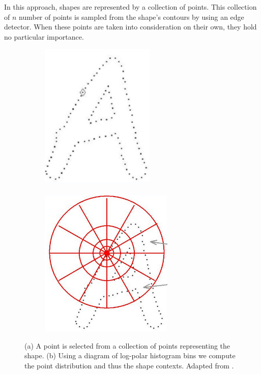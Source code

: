 In this approach, shapes are represented by a collection of points. This collection of $n$ number of points is sampled from the shape's contours by using an edge detector. When these points are taken into consideration on their own, they hold no particular importance.\\

\begin{figure}[h]
        \centering
        \begin{subfigure}[b]{0.36\textwidth}
                \centering
                \includegraphics[width=0.6\textwidth]{figures/LitreatureReview/letter.png}
                \caption{}
        \end{subfigure}
        \begin{subfigure}[b]{0.36\textwidth}
                \centering
                \includegraphics[width=0.7\textwidth]{figures/LitreatureReview/letterpoints.png}
                \caption{}
        \end{subfigure}
        \caption[Point selection and calculated distribution shape context descriptor]{(a) A point is selected from a collection of points representing the shape. (b) Using a diagram of log-polar histogram bins we compute the point distribution and thus the shape contexts. Adapted from \cite{context}.}
        \label{fig:contextPart1}
\end{figure} 

